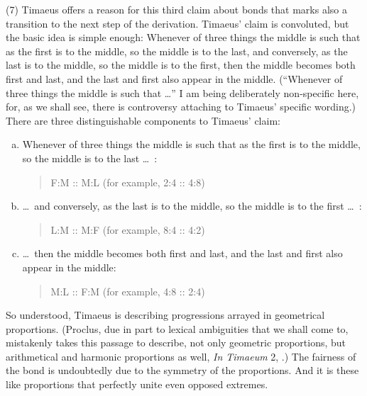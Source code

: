 (7) Timaeus offers a reason for this third claim about bonds that marks also a transition to the next step of the derivation. Timaeus' claim is convoluted, but the basic idea is simple enough: Whenever of three things the middle is such that as the first is to the middle, so the middle is to the last, and conversely, as the last is to the middle, so the middle is to the first, then the middle becomes both first and last, and the last and first also appear in the middle. (``Whenever of three things the middle is such that \ldots'' I am being deliberately non-specific here, for, as we shall see, there is controversy attaching to Timaeus' specific wording.) There are three distinguishable components to Timaeus' claim:
\begin{enumerate}[(a)]
	\item Whenever of three things the middle is such that as the first is to the middle, so the middle is to the last \ldots\ :
	\begin{quote}
		F:M :: M:L (for example, 2:4 :: 4:8)
	\end{quote}
	\item \ldots\ and conversely, as the last is to the middle, so the middle is to the first \dots\ :
	\begin{quote}
		L:M :: M:F (for example, 8:4 :: 4:2)
	\end{quote}
	\item \ldots\ then the middle becomes both first and last, and the last and first also appear in the middle:
	\begin{quote}
		M:L :: F:M (for example, 4:8 :: 2:4)
	\end{quote}
\end{enumerate}
So understood, Timaeus is describing progressions arrayed in geometrical proportions. (Proclus, due in part to lexical ambiguities that we shall come to, mistakenly takes this passage to describe, not only geometric proportions, but arithmetical and harmonic proportions as well, \emph{In Timaeum} 2, \citealt{Diehl:1903re}.) The fairness of the bond is undoubtedly due to the symmetry of the proportions. And it is these like proportions that perfectly unite even opposed extremes.  

